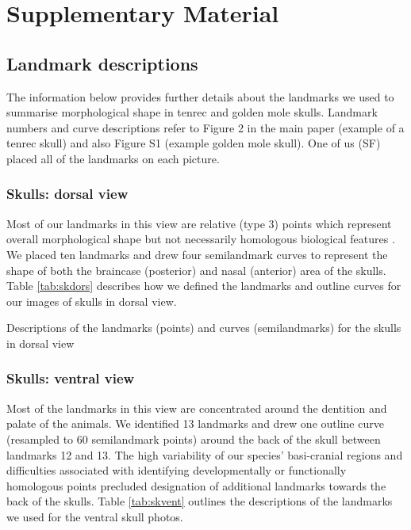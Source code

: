 \documentclass[12pt,a4paper]{article}
\newcommand{\beginsupplement}{%
	       \setcounter{table}{0}
	        \renewcommand{\thetable}{S\arabic{table}}%
	        \setcounter{figure}{0}
	        \renewcommand{\thefigure}{S\arabic{figure}}%
	     }
\begin{document}
\beginsupplement

{\centering\section{Supplementary Material}}

\subsection{Landmark descriptions}
\vspace*{-0.5cm}
	The information below provides further details about the landmarks we used to summarise morphological shape in tenrec and golden mole skulls. Landmark numbers and curve descriptions refer to Figure 2 in the main paper (example of a tenrec skull) and also Figure S1 (example golden mole skull). One of us (SF) placed all of the landmarks on each picture.

\subsubsection{Skulls: dorsal view}
\vspace*{-0.5cm}
	Most of our landmarks in this view are relative (type 3) points which represent overall morphological shape but not necessarily homologous biological features \citep{Zelditch2012}. We placed ten landmarks and drew four semilandmark curves to represent the shape of both the braincase (posterior) and nasal (anterior) area of the skulls. Table \ref{tab:skdors} describes how we defined the landmarks and outline curves for our images of skulls in dorsal view.

\begin{table}[h]
	\caption[Skulls: dorsal landmarks]
		{Descriptions of the landmarks (points) and curves (semilandmarks) for the skulls in dorsal view} 
	
	\label{tab:skdors}
\end{table}

\subsubsection{Skulls: ventral view}
\vspace*{-0.5cm}
	Most of the landmarks in this view are concentrated around the dentition and palate of the animals. We identified 13 landmarks and drew one outline curve (resampled to 60 semilandmark points) around the back of the skull between landmarks 12 and 13. The high variability of our species' basi-cranial regions and difficulties associated with identifying developmentally or functionally homologous points precluded designation of additional landmarks towards the back of the skulls. Table \ref{tab:skvent} outlines the descriptions of the landmarks we used for the ventral skull photos.
\end{document}
